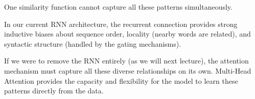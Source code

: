 \documentclass{article}
\begin{document}
One similarity function cannot capture all these patterns simultaneously.

\begin{tcolorbox}[colback=blue!5!white, colframe=blue!50!black, title=Looking Ahead: MHA's Expanding Role]
In our current RNN architecture, the recurrent connection provides strong inductive biases about sequence order, locality (nearby words are related), and syntactic structure (handled by the gating mechanisms). 

If we were to remove the RNN entirely (as we will next lecture), the attention mechanism must capture all these diverse relationships on its own. Multi-Head Attention provides the capacity and flexibility for the model to learn these patterns directly from the data.
\end{tcolorbox}







    
    
    
\end{document}
